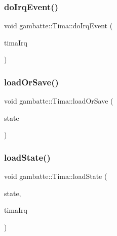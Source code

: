 \subsubsection{\texorpdfstring{do\+Irq\+Event()}{doIrqEvent()}}
{\footnotesize\ttfamily void gambatte\+::\+Tima\+::do\+Irq\+Event (\begin{DoxyParamCaption}\item[{\hyperlink{classgambatte_1_1TimaInterruptRequester}{Tima\+Interrupt\+Requester}}]{tima\+Irq }\end{DoxyParamCaption})}

\mbox{\label{classgambatte_1_1Tima_a42f102eee85822ce7b484679d9d36132}} 
\subsubsection{\texorpdfstring{load\+Or\+Save()}{loadOrSave()}}
{\footnotesize\ttfamily void gambatte\+::\+Tima\+::load\+Or\+Save (\begin{DoxyParamCaption}\item[{\hyperlink{classgambatte_1_1loadsave}{loadsave} \&}]{state }\end{DoxyParamCaption})}

\mbox{\label{classgambatte_1_1Tima_a5754a2d76e158ed3cae830cb52cc58c3}} 
\subsubsection{\texorpdfstring{load\+State()}{loadState()}}
{\footnotesize\ttfamily void gambatte\+::\+Tima\+::load\+State (\begin{DoxyParamCaption}\item[{const \hyperlink{structgambatte_1_1SaveState}{Save\+State} \&}]{state,  }\item[{\hyperlink{classgambatte_1_1TimaInterruptRequester}{Tima\+Interrupt\+Requester}}]{tima\+Irq }\end{DoxyParamCaption})}

\mbox{\label{classgambatte_1_1Tima_ae79b79227e0c0ace7d1dd173ae525b27}} 
